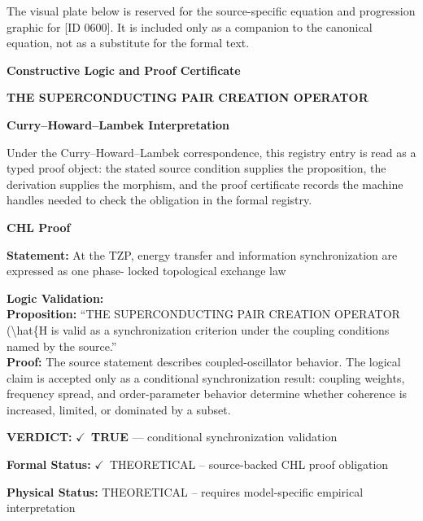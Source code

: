 \begingroup\footnotesize\sloppy
The visual plate below is reserved for the source-specific equation and progression graphic for [ID 0600]. It is included only as a companion to the canonical equation, not as a substitute for the formal text.
\par\endgroup
\ifTZPDarkEdition
{}
\fi

\clearpage
\begingroup\tzpsupportsetup
\noindent\textbf{\fontsize{10.8pt}{12.8pt}\selectfont [ID 0600] Constructive Logic and Proof Certificate}\par
\noindent\textbf{\fontsize{10pt}{12pt}\selectfont THE SUPERCONDUCTING PAIR CREATION OPERATOR}\par
\vspace{0.45em}
\begingroup
\footnotesize
\setlength{\parskip}{0.22em}
\setlength{\parindent}{0pt}
\noindent\textbf{Curry--Howard--Lambek Interpretation}\par
Under the Curry--Howard--Lambek correspondence, this registry entry is read as a typed proof
object: the stated source condition supplies the proposition, the derivation supplies the
morphism, and the proof certificate records the machine handles needed to check the obligation
in the formal registry.

\vspace{0.45em}
\noindent\textbf{CHL Proof}\par
\textbf{Statement:} At the TZP, energy transfer and information synchronization are expressed as one phase-
locked topological exchange law

\textbf{Logic Validation:}\\
\textbf{Proposition:} ``THE SUPERCONDUCTING PAIR CREATION OPERATOR (\textbackslash{}hat\{H is valid as a synchronization
criterion under the coupling conditions named by the source.''\\
\textbf{Proof:} The source statement describes coupled-oscillator behavior. The logical claim is
accepted only as a conditional synchronization result: coupling weights, frequency
spread, and order-parameter behavior determine whether coherence is increased, limited,
or dominated by a subset.

\textbf{VERDICT:} \ensuremath{\checkmark}\ \textbf{TRUE} --- conditional synchronization validation

\textbf{Formal Status:} \ensuremath{\checkmark}\ THEORETICAL -- source-backed CHL proof obligation

\textbf{Physical Status:} THEORETICAL -- requires model-specific empirical interpretation
\par\vspace{0.45em}
\par
\ifTZPDarkEdition
{}
\fi
\endgroup
\endgroup
